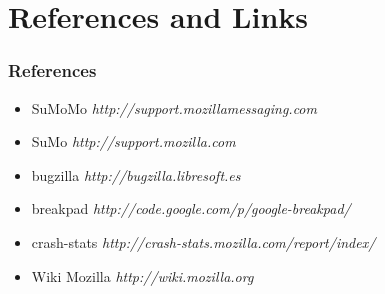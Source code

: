 \documentclass{beamer}
\begin{document}

\section{References and Links}

\begin{frame}
 \frametitle{References}
 \begin{itemize}
    \item SuMoMo \textit{http://support.mozillamessaging.com}
    \item SuMo \textit{http://support.mozilla.com}
    \item bugzilla \textit{http://bugzilla.libresoft.es}
    \item breakpad \textit{http://code.google.com/p/google-breakpad/}
    \item crash-stats \textit{http://crash-stats.mozilla.com/report/index/}
    \item Wiki Mozilla \textit{http://wiki.mozilla.org}
  \end{itemize}

\end{frame}

\end{document}
